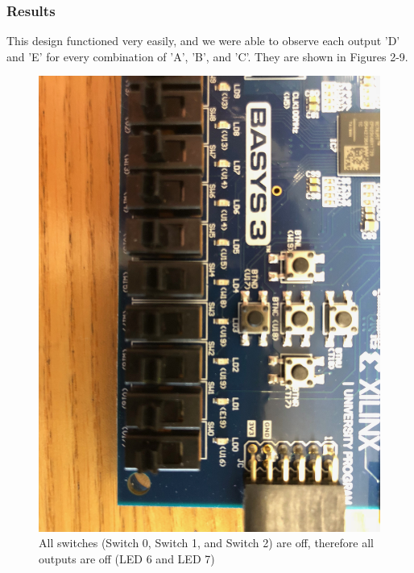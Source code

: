 \documentclass[11pt]{article}
\begin{document}
\subsubsection{Results}

This design functioned very easily, and we were able to observe each output 'D' and 'E' for every combination of 'A', 'B', and 'C'. They are shown in Figures 2-9. 

\begin{figure}[H]
	\includegraphics[width=\textwidth]{report_images/Lab1BoardPictures/Lab1Part1/IMG_0403.jpg}
	\caption{\label{fig:figure-name}All switches (Switch 0, Switch 1, and Switch 2) are off, therefore all outputs are off (LED 6 and LED 7)}
\end{figure}
\end{document}

